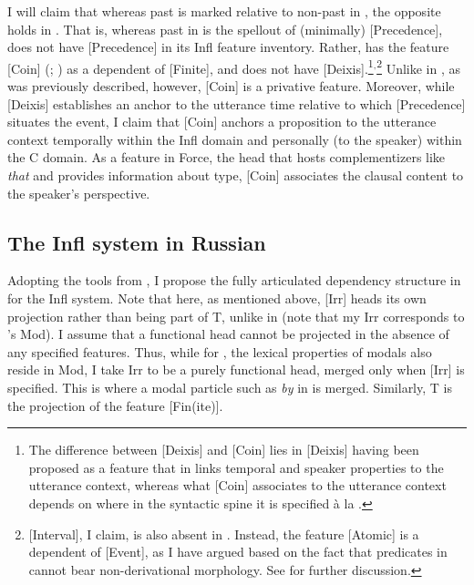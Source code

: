 \documentclass[output=paper,modfonts,newtxmath,hidelinks,]{langscibook}
\begin{document}
\noindent I will claim that whereas past is marked relative to non-past in , the opposite holds in . That is, whereas past in  is the spellout of (minimally) [Precedence],  does not have [Precedence] in its Infl feature inventory. Rather,  has the feature [Coin] (\citealt{RitterWiltschko2005}; \citealt{Wiltschko,Wiltschko2014}) as a dependent of [Finite], and does not have [Deixis].\footnote{\label{10:fn2}The difference between [Deixis] and [Coin] lies in [Deixis] having been proposed as a feature that in  links temporal and speaker properties to the utterance context, whereas what [Coin] associates to the utterance context depends on where in the syntactic spine it is specified à la \citet{RamchandSvenonius2014}.}$^,$\footnote{\label{10:fn3}[Interval], I claim, is also absent in . Instead, the feature [Atomic] is a dependent of [Event], as I have argued based on the fact that  predicates in  cannot bear non-derivational  morphology. See \citet{Melara2014} for further discussion.} Unlike in \citet{Wiltschko}, as was previously described, however, [Coin] is a privative feature. Moreover, while [Deixis] establishes an anchor to the utterance time relative to which [Precedence] situates the event, I claim that [Coin] anchors a proposition to the utterance context temporally within the Infl domain and personally (to the speaker) within the C domain. As a feature in Force, the head that hosts complementizers like  \textit{that} and provides information about  type, [Coin] associates the clausal content to the speaker’s perspective.

\subsection{The Infl system in Russian}\label{10:s4.2}

Adopting the tools from \citet{Cowper2005,Cowper2010}, I propose the fully articulated dependency structure in  for the  Infl system. Note that here, as mentioned above, [Irr] heads its own projection rather than being part of T, unlike in \citet{Cowper2010} (note that my Irr corresponds to \citeauthor{Cowper2010}'s Mod). I assume that a functional head cannot be projected in the absence of any specified features. Thus, while for \citeauthor{Cowper2010}, the lexical properties of modals also reside in Mod, I take Irr to be a purely functional head, merged only when [Irr] is specified. This is where a modal particle such as \textit{by} in  is merged. Similarly, T is the projection of the feature [Fin(ite)].
\end{document}
